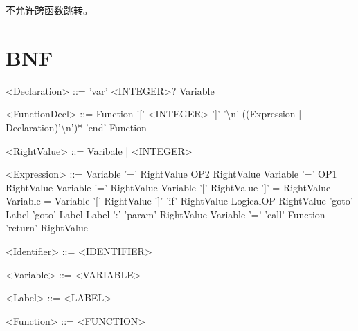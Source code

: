 \documentclass{ctexart}
\newenvironment{typewriterfont}{\ttfamily}{\par}
\begin{document}
不允许跨函数跳转。

\section{BNF}
\begin{typewriterfont}
\setlength{\grammarindent}{8em} %
\begin{grammar}
\small
<Declaration> ::= 'var' <INTEGER>? Variable

<FunctionDecl> ::= Function '[' <INTEGER> ']' '\textbackslash n' ((Expression | Declaration)'\textbackslash n')* 'end' Function

<RightValue> ::= Varibale | <INTEGER>

<Expression>	::=	Variable '=' RightValue OP2 RightValue
\alt Variable '=' OP1 RightValue
\alt Variable '=' RightValue
\alt Variable '[' RightValue ']' = RightValue
\alt Variable = Variable '[' RightValue ']'
\alt 'if' RightValue LogicalOP RightValue 'goto' Label
\alt 'goto' Label
\alt Label ':'
\alt 'param' RightValue
\alt Variable '=' 'call' Function
\alt 'return' RightValue


<Identifier>	::=	<IDENTIFIER>

<Variable> ::= <VARIABLE>

<Label> ::= <LABEL>

<Function> ::= <FUNCTION>

\end{grammar}
\end{typewriterfont}
\end{document}
